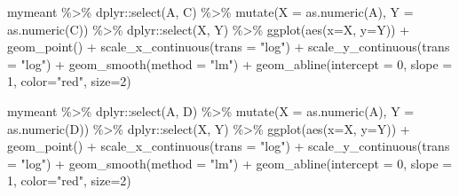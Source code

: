 \documentclass[
]{book}
\newenvironment{Shaded}{\begin{snugshade}}{\end{snugshade}}
\newcommand{\AttributeTok}[1]{\textcolor[rgb]{0.77,0.63,0.00}{#1}}
\newcommand{\DecValTok}[1]{\textcolor[rgb]{0.00,0.00,0.81}{#1}}
\newcommand{\FunctionTok}[1]{\textcolor[rgb]{0.00,0.00,0.00}{#1}}
\newcommand{\NormalTok}[1]{#1}
\newcommand{\SpecialCharTok}[1]{\textcolor[rgb]{0.00,0.00,0.00}{#1}}
\newcommand{\StringTok}[1]{\textcolor[rgb]{0.31,0.60,0.02}{#1}}
\begin{document}
\begin{Shaded}
\begin{Highlighting}[]
\NormalTok{mymeant }\SpecialCharTok{\%\textgreater{}\%} 
\NormalTok{  dplyr}\SpecialCharTok{::}\FunctionTok{select}\NormalTok{(A, C) }\SpecialCharTok{\%\textgreater{}\%} 
  \FunctionTok{mutate}\NormalTok{(}\AttributeTok{X =} \FunctionTok{as.numeric}\NormalTok{(A), }\AttributeTok{Y =} \FunctionTok{as.numeric}\NormalTok{(C)) }\SpecialCharTok{\%\textgreater{}\%} 
\NormalTok{  dplyr}\SpecialCharTok{::}\FunctionTok{select}\NormalTok{(X, Y) }\SpecialCharTok{\%\textgreater{}\%} 
  \FunctionTok{ggplot}\NormalTok{(}\FunctionTok{aes}\NormalTok{(}\AttributeTok{x=}\NormalTok{X, }\AttributeTok{y=}\NormalTok{Y)) }\SpecialCharTok{+}
  \FunctionTok{geom\_point}\NormalTok{() }\SpecialCharTok{+}
  \FunctionTok{scale\_x\_continuous}\NormalTok{(}\AttributeTok{trans =} \StringTok{"log"}\NormalTok{) }\SpecialCharTok{+}
  \FunctionTok{scale\_y\_continuous}\NormalTok{(}\AttributeTok{trans =} \StringTok{"log"}\NormalTok{) }\SpecialCharTok{+}
  \FunctionTok{geom\_smooth}\NormalTok{(}\AttributeTok{method =} \StringTok{"lm"}\NormalTok{) }\SpecialCharTok{+}
  \FunctionTok{geom\_abline}\NormalTok{(}\AttributeTok{intercept =} \DecValTok{0}\NormalTok{, }\AttributeTok{slope =} \DecValTok{1}\NormalTok{, }\AttributeTok{color=}\StringTok{"red"}\NormalTok{, }\AttributeTok{size=}\DecValTok{2}\NormalTok{) }


\NormalTok{mymeant }\SpecialCharTok{\%\textgreater{}\%} 
\NormalTok{  dplyr}\SpecialCharTok{::}\FunctionTok{select}\NormalTok{(A, D) }\SpecialCharTok{\%\textgreater{}\%} 
  \FunctionTok{mutate}\NormalTok{(}\AttributeTok{X =} \FunctionTok{as.numeric}\NormalTok{(A), }\AttributeTok{Y =} \FunctionTok{as.numeric}\NormalTok{(D)) }\SpecialCharTok{\%\textgreater{}\%} 
\NormalTok{  dplyr}\SpecialCharTok{::}\FunctionTok{select}\NormalTok{(X, Y) }\SpecialCharTok{\%\textgreater{}\%} 
  \FunctionTok{ggplot}\NormalTok{(}\FunctionTok{aes}\NormalTok{(}\AttributeTok{x=}\NormalTok{X, }\AttributeTok{y=}\NormalTok{Y)) }\SpecialCharTok{+}
  \FunctionTok{geom\_point}\NormalTok{() }\SpecialCharTok{+}
  \FunctionTok{scale\_x\_continuous}\NormalTok{(}\AttributeTok{trans =} \StringTok{"log"}\NormalTok{) }\SpecialCharTok{+}
  \FunctionTok{scale\_y\_continuous}\NormalTok{(}\AttributeTok{trans =} \StringTok{"log"}\NormalTok{) }\SpecialCharTok{+}
  \FunctionTok{geom\_smooth}\NormalTok{(}\AttributeTok{method =} \StringTok{"lm"}\NormalTok{) }\SpecialCharTok{+}
  \FunctionTok{geom\_abline}\NormalTok{(}\AttributeTok{intercept =} \DecValTok{0}\NormalTok{, }\AttributeTok{slope =} \DecValTok{1}\NormalTok{, }\AttributeTok{color=}\StringTok{"red"}\NormalTok{, }\AttributeTok{size=}\DecValTok{2}\NormalTok{) }
\end{Highlighting}
\end{Shaded}
\end{document}
